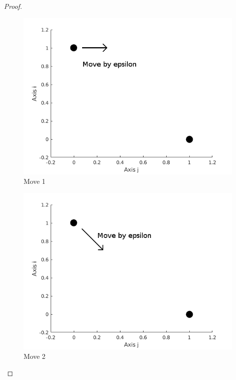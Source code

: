 \documentclass[journal]{IEEEtran}
\begin{document}
\begin{proof}
  \begin{figure}
    \centering
    \includegraphics[width = 0.9\linewidth]{./Images/WeightTheory/move1.png}
    \caption{Move 1}
    \label{fig:move1}
  \end{figure}
  \begin{figure}
    \centering
    \includegraphics[width = 0.9\linewidth]{./Images/WeightTheory/move2.png}
    \caption{Move 2}
    \label{fig:move2}
  \end{figure}
\end{proof}

 
\end{document}
